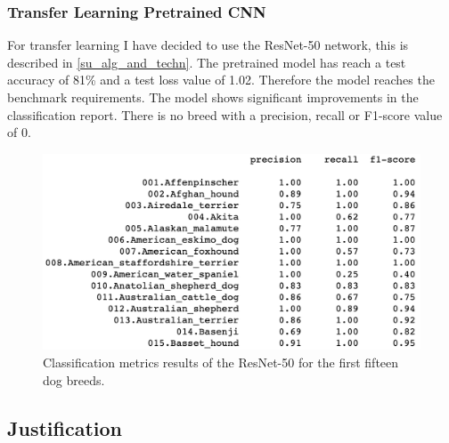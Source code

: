 \documentclass{article}
\begin{document}
\subsubsection{Transfer Learning Pretrained CNN}
For transfer learning I have decided to use the ResNet-50 network, this is described in \ref{su_alg_and_techn}. The pretrained model has reach a test accuracy of 81\% and a test loss value of 1.02. Therefore the model reaches the benchmark requirements.\newline
The model shows significant improvements in the classification report. There is no breed with a precision, recall or F1-score value of 0.
\begin{figure}[h]
    \centering
    \includegraphics[scale=0.45]{./images/transfer_classification_report}
    \caption{Classification metrics results of the ResNet-50 for the first fifteen dog breeds.}
    \label{fig:scratch_cnn_class_rep}
\end{figure}

\subsection{Justification}



\end{document}
